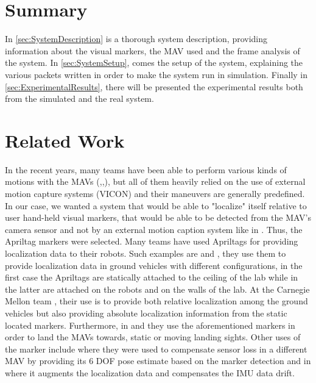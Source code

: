 \section{Summary}
\label{sec:summary}

In \autoref{sec:SystemDescription} is a thorough system description, providing information about the visual markers, the MAV used and the frame analysis of the system. In \autoref{sec:SystemSetup}, comes the setup of the system, explaining the various packets written in order to make the system run in simulation. Finally in \autoref{sec:ExperimentalResults}, there will be presented the experimental results both from the simulated and the real system.   
 
 
\section{Related Work}
\label{sec:related_work}

In the recent years, many teams have been able to perform various kinds of motions with the MAVs (\cite{5509452},\cite{hehIFAC11},\cite{trajectoryGenerationAndControl}), but all of them heavily relied on the use of external motion capture systems (VICON\protect\footnotemark) and their maneuvers are generally predefined. In our case, we wanted a system that would be able to "localize" itself relative to user hand-held visual markers, that would be able to be detected from the MAV's camera sensor and not by an external motion caption system like in \cite{dandreaTedTalk}. Thus, the Apriltag markers\cite{olson2011tags} were selected. Many teams have used Apriltags for providing localization data to their robots. Such examples are \cite{lafaroLab} and \cite{robornSwam}, they use them to provide localization data in ground vehicles with different configurations, in the first case the Apriltags are statically attached to the ceiling of the lab while in the latter are attached on the robots and on the walls of the lab. At the Carnegie Mellon team \cite{robornSwam}, their use is to provide both relative localization among the ground vehicles but also providing absolute localization information from the static located markers. Furthermore, in \cite{lingkevin2014} and \cite{schaves-2015a} they use the aforementioned markers in order to land the MAVs towards, static or moving landing sights. Other uses of the marker include  \cite{hoogervorst2015bsc} where they were used to compensate sensor loss in a different MAV by providing its 6 DOF pose estimate based on the marker detection and in \cite{6842304} where it augments the localization data and compensates the IMU data drift. 




  
  
  
  
  
  
  


